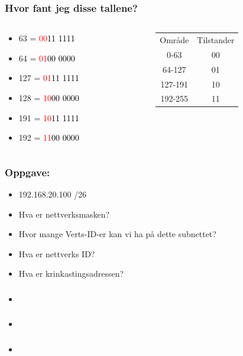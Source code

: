 \documentclass[aspectratio=169,xcolor=dvipsnames]{beamer}
\begin{document}
\begin{frame}
	\frametitle{Hvor fant jeg disse tallene?}

	\begin{columns}
		\begin{column}{0.5\textwidth}

			\begin{itemize}
				\item 63 = \textcolor{red}{00}\textcolor{black}{11 1111}
				\item 64 = \textcolor{red}{01}\textcolor{black}{00 0000}
				\item 127 = \textcolor{red}{01}\textcolor{black}{11 1111}
				\item 128 = \textcolor{red}{10}\textcolor{black}{00 0000}
				\item 191 = \textcolor{red}{10}\textcolor{black}{11 1111}
				\item 192 = \textcolor{red}{11}\textcolor{black}{00 0000}
			\end{itemize}
		\end{column}

		\begin{column}{0.5\textwidth}
\begin{tabular}{ c c }
	Område & Tilstander\\
	0-63 & 00 \\
	64-127 & 01 \\
	127-191 & 10 \\
	192-255 & 11 
\end{tabular}
		\end{column}
	\end{columns}
\end{frame}
\begin{frame}
	\frametitle{Oppgave:}

			\begin{itemize}
				\item 192.168.20.100 /26
				\item Hva er nettverksmasken?
				\item Hvor mange Verts-ID-er kan vi ha på dette subnettet?
				\item Hva er nettverks ID?
				\item Hva er krinkastingsadressen?
			\end{itemize}
\end{frame}
\begin{frame}
	\frametitle{}

			\begin{itemize}
				\item
			\end{itemize}
\end{frame}
\begin{frame}
	\frametitle{}

			\begin{itemize}
				\item
			\end{itemize}
\end{frame}
\begin{frame}
	\frametitle{}

			\begin{itemize}
				\item
			\end{itemize}
\end{frame}
\end{document}
